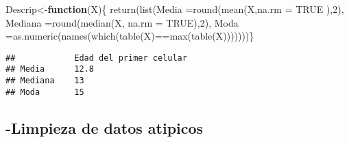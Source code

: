 \documentclass[
]{article}
\newenvironment{Shaded}{\begin{snugshade}}{\end{snugshade}}
\newcommand{\AttributeTok}[1]{\textcolor[rgb]{0.77,0.63,0.00}{#1}}
\newcommand{\ConstantTok}[1]{\textcolor[rgb]{0.00,0.00,0.00}{#1}}
\newcommand{\ControlFlowTok}[1]{\textcolor[rgb]{0.13,0.29,0.53}{\textbf{#1}}}
\newcommand{\DecValTok}[1]{\textcolor[rgb]{0.00,0.00,0.81}{#1}}
\newcommand{\FunctionTok}[1]{\textcolor[rgb]{0.00,0.00,0.00}{#1}}
\newcommand{\NormalTok}[1]{#1}
\newcommand{\OtherTok}[1]{\textcolor[rgb]{0.56,0.35,0.01}{#1}}
\newcommand{\SpecialCharTok}[1]{\textcolor[rgb]{0.00,0.00,0.00}{#1}}
\newcommand{\StringTok}[1]{\textcolor[rgb]{0.31,0.60,0.02}{#1}}
\begin{document}
\begin{Shaded}
\begin{Highlighting}[]
\NormalTok{Descrip}\OtherTok{\textless{}{-}}\ControlFlowTok{function}\NormalTok{(X)\{}
  \FunctionTok{return}\NormalTok{(}\FunctionTok{list}\NormalTok{(}\StringTok{\textquotesingle{}Media  \textquotesingle{}}\OtherTok{=}\FunctionTok{round}\NormalTok{(}\FunctionTok{mean}\NormalTok{(X,}\AttributeTok{na.rm =} \ConstantTok{TRUE}\NormalTok{ ),}\DecValTok{2}\NormalTok{), }\StringTok{\textquotesingle{}Mediana   \textquotesingle{}}\OtherTok{=}\FunctionTok{round}\NormalTok{(}\FunctionTok{median}\NormalTok{(X, }\AttributeTok{na.rm =} \ConstantTok{TRUE}\NormalTok{),}\DecValTok{2}\NormalTok{), }\StringTok{\textquotesingle{}Moda    \textquotesingle{}}\OtherTok{=}\FunctionTok{as.numeric}\NormalTok{(}\FunctionTok{names}\NormalTok{(}\FunctionTok{which}\NormalTok{(}\FunctionTok{table}\NormalTok{(X)}\SpecialCharTok{==}\FunctionTok{max}\NormalTok{(}\FunctionTok{table}\NormalTok{(X)))))))\}}
\end{Highlighting}
\end{Shaded}

\begin{Shaded}
\end{Shaded}

\begin{verbatim}
##            Edad del primer celular  
## Media      12.8                     
## Mediana    13                       
## Moda       15
\end{verbatim}

\hypertarget{limpieza-de-datos-atipicos}{%
\subsection{-Limpieza de datos
atipicos}\label{limpieza-de-datos-atipicos}}

\begin{Shaded}
\end{Shaded}
\end{document}
